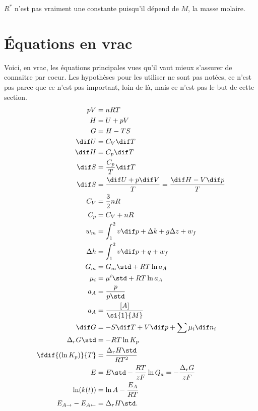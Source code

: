 \begin{myrem}
$R^*$ n'est pas vraiment une constante puisqu'il dépend de $M$,
la masse molaire.
\end{myrem}

\section{Équations en vrac}
Voici, en vrac, les équations principales vues qu'il vaut mieux
s'assurer de connaitre par coeur.
Les hypothèses pour les utiliser ne sont pas notées,
ce n'est pas parce que ce n'est pas important,
loin de là, mais ce n'est pas le but de cette section.
\begin{align*}
  pV & = nRT\\
  H & = U + pV\\
  G & = H - TS\\
  \dif U & = C_V \dif T\\
  \dif H & = C_p \dif T\\
  \dif S & = \frac{C_p}{T} \dif T\\
  \dif S & = \frac{\dif U + p \dif V}{T} = \frac{\dif H - V \dif p}{T}\\
  C_V & = \frac 32 nR\\
  C_p & = C_V + nR\\
  w_m & = \int_1^2 v\dif p + \Delta k + g\Delta z + w_f\\
  \Delta h & = \int_1^2 v\dif p + q + w_f\\
  G_m & = G_m\std + RT \ln a_A\\
  \mu_i & = {\mu^i}\std + RT \ln a_A\\
  a_A & = \frac{p}{p\std}\\
  a_A & = \frac{[A]}{\si{1}{M}}\\
  \dif G & = -S\dif T + V\dif p + \sum \mu_i \dif n_i\\
  \Delta_r G\std & = -RT\ln K_p\\
  \fdif{(\ln K_p)}{T} & = \frac{\Delta_r H\std}{RT^2}\\
  E & = E\std - \frac{RT}{zF} \ln Q_a = -\frac{\Delta_r G}{zF}\\
  \ln(k(t)) & = \ln A - \frac{E_A}{RT}\\
  E_{A\rightarrow} - E_{A\leftarrow} & = \Delta_r H\std.
\end{align*}


